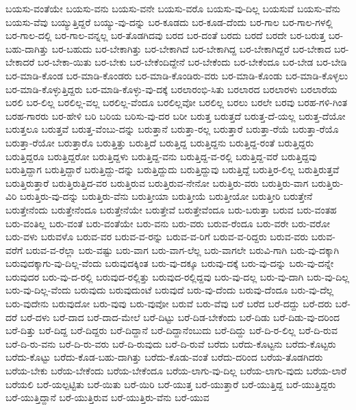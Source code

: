 {ಬಯಸು-ವಂತೆಯೇ
ಬಯಸು-ವನು
ಬಯಸು-ವನೇ
ಬಯಸು-ವರೊ
ಬಯಸು-ವು-ದಿಲ್ಲ
ಬಯಸುವೆ
ಬಯಸು-ವೆನು
ಬಯಸು-ವೆವು
ಬಯ್ಯುತ್ತಿದ್ದರೆ
ಬಯ್ಯು-ವು-ದನ್ನು
ಬರ-ಕೂಡದು
ಬರ-ಕೂಡ-ದೆಂದು
ಬರ-ಗಾಲ
ಬರ-ಗಾಲ-ಗಳಲ್ಲಿ
ಬರ-ಗಾಲ-ದಲ್ಲಿ
ಬರ-ಗಾಲ-ವನ್ನಲ್ಲ
ಬರ-ತೊಡಗಿದವು
ಬರದ
ಬರ-ದಂತೆ
ಬರದು
ಬರದೆ
ಬರದೇ
ಬರ-ಬರುತ್ತ
ಬರ-ಬಹು-ದಾಗಿತ್ತು
ಬರ-ಬಹುದು
ಬರ-ಬೇಕಾಗಿತ್ತು
ಬರ-ಬೇಕಾಗಿದೆ
ಬರ-ಬೇಕಾಗಿದ್ದ
ಬರ-ಬೇಕಾಗಿದ್ದರೆ
ಬರ-ಬೇಕಾದ
ಬರ-ಬೇಕಾದರೆ
ಬರ-ಬೇಕಾ-ಯಿತು
ಬರ-ಬೇಕು
ಬರ-ಬೇಕೆಂದಿದ್ದೇನೆ
ಬರ-ಬೇಕೆಂದು
ಬರ-ಬೇಕೆಂದೂ
ಬರ-ಬೇಡ
ಬರ-ಬೇಡಿ
ಬರ-ಮಾಡಿ-ಕೊಂಡ
ಬರ-ಮಾಡಿ-ಕೊಂಡರು
ಬರ-ಮಾಡಿ-ಕೊಂಡಿರು-ವರು
ಬರ-ಮಾಡಿ-ಕೊಂಡು
ಬರ-ಮಾಡಿ-ಕೊಳ್ಳಲು
ಬರ-ಮಾಡಿ-ಕೊಳ್ಳುತ್ತಿದ್ದರು
ಬರ-ಮಾಡಿ-ಕೊಳ್ಳು-ವು-ದಕ್ಕೆ
ಬರಲಾರಂಭಿ-ಸಿತು
ಬರಲಾರದ
ಬರಲಾರಳು
ಬರಲಾರೆಯ
ಬರಲಿ
ಬರ-ಲಿಲ್ಲ
ಬರಲಿಲ್ಲ-ವಲ್ಲ
ಬರಲಿಲ್ಲ-ವೆಂದೂ
ಬರಲಿಲ್ಲವೋ
ಬರಲಿಲ್ಲ
ಬರಲು
ಬರಲೇ
ಬರವು
ಬರಹ-ಗಳಿ-ಗಿಂತ
ಬರಹ-ಗಾರರು
ಬರ-ಹೇಳಿ
ಬರಿ
ಬರಿಯ
ಬರಿಸು-ವು-ದರ
ಬರೀ
ಬರುತ್ತ
ಬರುತ್ತದೆ
ಬರುತ್ತ-ದೆ-ಯಲ್ಲ
ಬರುತ್ತ-ದೆಯೋ
ಬರುತ್ತಲೂ
ಬರುತ್ತವೆ
ಬರುತ್ತ-ವೆಂಬು-ದನ್ನು
ಬರುತ್ತಾನೆ
ಬರುತ್ತಾ-ರಲ್ಲ
ಬರುತ್ತಾರೆ
ಬರುತ್ತಾ-ರೆಯೆ
ಬರುತ್ತಾ-ರೆಯೊ
ಬರುತ್ತಾ-ರೆಯೋ
ಬರುತ್ತಾರೊ
ಬರುತ್ತಿತ್ತು
ಬರುತ್ತಿದೆ
ಬರುತ್ತಿದ್ದ
ಬರುತ್ತಿದ್ದನು
ಬರುತ್ತಿದ್ದ-ರಂತೆ
ಬರುತ್ತಿದ್ದರು
ಬರುತ್ತಿದ್ದರೂ
ಬರುತ್ತಿದ್ದರೋ
ಬರುತ್ತಿದ್ದಳು
ಬರುತ್ತಿದ್ದ-ವನು
ಬರುತ್ತಿದ್ದ-ವ-ರಲ್ಲಿ
ಬರುತ್ತಿದ್ದ-ವರೆ
ಬರುತ್ತಿದ್ದವು
ಬರುತ್ತಿದ್ದಾಗ
ಬರುತ್ತಿದ್ದಾರೆ
ಬರುತ್ತಿದ್ದು-ದನ್ನು
ಬರುತ್ತಿದ್ದುದು
ಬರುತ್ತಿದ್ದುವು
ಬರುತ್ತಿದ್ದೆ
ಬರುತ್ತಿರ-ಲಿಲ್ಲ
ಬರುತ್ತಿರುತ್ತವೆ
ಬರುತ್ತಿರುತ್ತಾರೆ
ಬರುತ್ತಿರುತ್ತಿದ-ವರ
ಬರುತ್ತಿರುವ
ಬರುತ್ತಿರುವ-ನೇನೋ
ಬರುತ್ತಿರು-ವರು
ಬರುತ್ತಿರು-ವಾಗ
ಬರುತ್ತಿರು-ವಿರಿ
ಬರುತ್ತಿರು-ವು-ದನ್ನು
ಬರುತ್ತಿರು-ವೆನು
ಬರುತ್ತೀಯಾ
ಬರುತ್ತೀಯೆ
ಬರುತ್ತೀಯೋ
ಬರುತ್ತೀರಿ
ಬರುತ್ತೇನೆ
ಬರುತ್ತೇನೆಂದು
ಬರುತ್ತೇನೆಂದೂ
ಬರುತ್ತೇನೆಯೇ
ಬರುತ್ತೇವೆ
ಬರುತ್ತೇವೆಂದೂ
ಬರು-ಬರುತ್ತಾ
ಬರುವ
ಬರು-ವಂತಹ
ಬರು-ವಂತಿಲ್ಲ
ಬರು-ವಂತೆ
ಬರು-ವಂತೆಯೇ
ಬರು-ವನು
ಬರು-ವರು
ಬರುವ-ರೆಂದೂ
ಬರು-ವರೇ
ಬರು-ವರೋ
ಬರು-ವಳು
ಬರುವಳೊ
ಬರುವ-ವರ
ಬರುವ-ವ-ರನ್ನು
ಬರುವ-ವ-ರಿಗೆ
ಬರುವ-ವ-ರಿದ್ದರು
ಬರುವ-ವರು
ಬರುವ-ವರೆಗೆ
ಬರುವ-ವ-ರೆಲ್ಲಾ
ಬರು-ವಷ್ಟು
ಬರು-ವಾಗ
ಬರು-ವಾಗ-ಲೆಲ್ಲ
ಬರು-ವಾಗಲೇ
ಬರುವಿ-ಗಾಗಿ
ಬರು-ವು-ದಕ್ಕಾಗಿ
ಬರುವುದಕ್ಕಾಗು-ವು-ದಿಲ್ಲ-ವೆಂದು
ಬರುವುದಕ್ಕಿಂತ
ಬರು-ವು-ದಕ್ಕೂ
ಬರುವು-ದಕ್ಕೆ
ಬರು-ವು-ದನ್ನು
ಬರು-ವು-ದನ್ನೇ
ಬರುವುದರ
ಬರು-ವು-ದ-ರಲ್ಲಿ
ಬರುವುದ-ರಲ್ಲಿತ್ತು
ಬರುವುದ-ರಲ್ಲಿದ್ದವು
ಬರು-ವು-ದಲ್ಲ
ಬರು-ವು-ದಾಗಿ
ಬರು-ವು-ದಿಲ್ಲ
ಬರು-ವು-ದಿಲ್ಲ-ವೆಂದು
ಬರುವುದು
ಬರುವುದುಂಟೆ
ಬರುವುದೆ
ಬರು-ವು-ದೆಂದು
ಬರುವು-ದೆಂದೂ
ಬರು-ವು-ದೆಲ್ಲ
ಬರು-ವುದೇನು
ಬರುವುದೋ
ಬರು-ವುವು
ಬರು-ವುವೋ
ಬರುವೆ
ಬರು-ವೆವು
ಬರೆ
ಬರೆದ
ಬರೆ-ದದ್ದು
ಬರೆ-ದರು
ಬರೆ-ದರೆ
ಬರೆ-ದಳು
ಬರೆ-ದಾದ
ಬರೆ-ದಾದ-ಮೇಲೆ
ಬರೆ-ದಿಟ್ಟು
ಬರೆ-ದಿಡ-ಬೇಕೆಂದು
ಬರೆ-ದಿಡು
ಬರೆ-ದಿಡು-ವು-ದರಿಂದ
ಬರೆ-ದಿತ್ತು
ಬರೆ-ದಿದ್ದ
ಬರೆ-ದಿದ್ದರು
ಬರೆ-ದಿದ್ದಾನೆ
ಬರೆ-ದಿದ್ದಾನೆಂಬುದು
ಬರೆ-ದಿದ್ದು
ಬರೆ-ದಿ-ರ-ಲಿಲ್ಲ
ಬರೆ-ದಿ-ರುವ
ಬರೆ-ದಿ-ರು-ವನು
ಬರೆ-ದಿ-ರು-ವರು
ಬರೆ-ದಿ-ರುವುದು
ಬರೆ-ದಿ-ರುವೆ
ಬರೆದು
ಬರೆದು-ಕೊಟ್ಟನು
ಬರೆದು-ಕೊಟ್ಟರು
ಬರೆದು-ಕೊಟ್ಟು
ಬರೆದು-ಕೊಡ-ಬಹು-ದಾಗಿತ್ತು
ಬರೆದು-ಕೊಡು-ವಂತೆ
ಬರೆದು-ದರಿಂದ
ಬರೆಯ-ತೊಡಗಿದರು
ಬರೆಯ-ಬೇಕು
ಬರೆಯ-ಬೇಕೆಂದು
ಬರೆಯ-ಬೇಕೆಂದೂ
ಬರೆಯ-ಲಾಗು-ವು-ದಿಲ್ಲ
ಬರೆಯ-ಲಾಗು-ವುದು
ಬರೆಯ-ಲಾರೆ
ಬರೆಯಲಿ
ಬರೆ-ಯಲ್ಪಟ್ಟಿತು
ಬರೆ-ಯಿತು
ಬರೆ-ಯಿರಿ
ಬರೆ-ಯುತ್ತ
ಬರೆ-ಯುತ್ತಾರೆ
ಬರೆ-ಯುತ್ತಿದ್ದ
ಬರೆ-ಯುತ್ತಿದ್ದರು
ಬರೆ-ಯುತ್ತಿದ್ದಾನೆ
ಬರೆ-ಯುತ್ತಿರುವ
ಬರೆ-ಯುತ್ತಿರು-ವೆನು
ಬರೆ-ಯುವ
}
